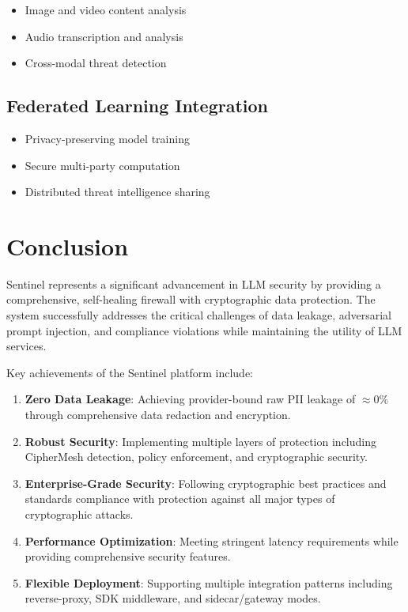 \documentclass[12pt]{article}
\begin{document}
\begin{itemize}
    \item Image and video content analysis
    \item Audio transcription and analysis
    \item Cross-modal threat detection
\end{itemize}

\subsection{Federated Learning Integration}

\begin{itemize}
    \item Privacy-preserving model training
    \item Secure multi-party computation
    \item Distributed threat intelligence sharing
\end{itemize}

\section{Conclusion}

Sentinel represents a significant advancement in LLM security by providing a comprehensive, self-healing firewall with cryptographic data protection. The system successfully addresses the critical challenges of data leakage, adversarial prompt injection, and compliance violations while maintaining the utility of LLM services.

Key achievements of the Sentinel platform include:

\begin{enumerate}
    \item \textbf{Zero Data Leakage}: Achieving provider-bound raw PII leakage of $\approx 0\%$ through comprehensive data redaction and encryption.
    
    \item \textbf{Robust Security}: Implementing multiple layers of protection including CipherMesh detection, policy enforcement, and cryptographic security.
    
    \item \textbf{Enterprise-Grade Security}: Following cryptographic best practices and standards compliance with protection against all major types of cryptographic attacks.
    
    \item \textbf{Performance Optimization}: Meeting stringent latency requirements while providing comprehensive security features.
    
    \item \textbf{Flexible Deployment}: Supporting multiple integration patterns including reverse-proxy, SDK middleware, and sidecar/gateway modes.
\end{enumerate}
\end{document}

